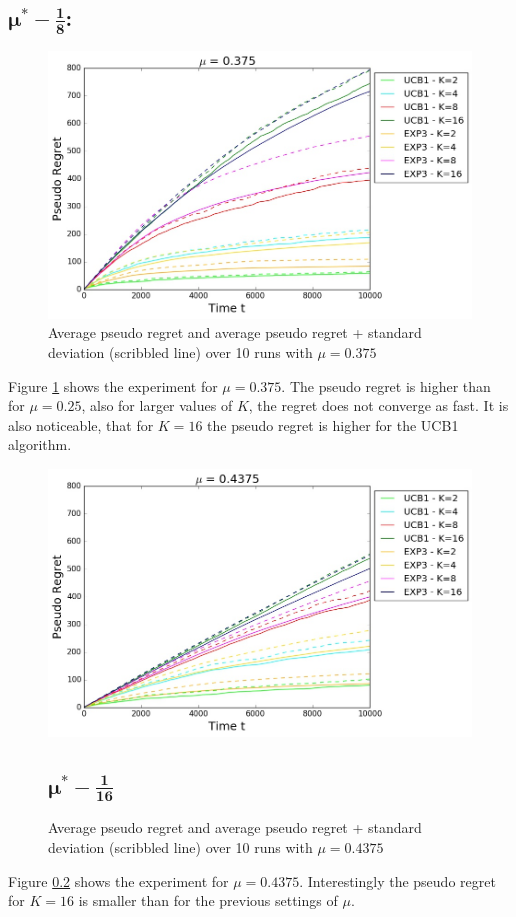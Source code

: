 \documentclass{article}
\begin{document}
\subsection{$\mathbf{\mu^* - \frac{1}{8}}$:}
\begin{figure}[H]
 \centering  \includegraphics[width=17cm]{fig/222.jpg}
  \caption{\footnotesize Average pseudo regret and average pseudo regret + standard deviation (scribbled line) over 10 runs with $\mu = 0.375$ }
\label{fig:2}
\end{figure}
Figure \ref{fig:2} shows the experiment for $\mu = 0.375$. The pseudo regret is higher than for $\mu = 0.25$, also for larger values of $K$, the regret does not converge as fast. It is also noticeable, that for $K=16$ the pseudo regret is higher for the UCB1 algorithm.
\begin{figure}[H]
 \centering  \includegraphics[width=17cm]{fig/333.jpg}
  \caption{\footnotesize Average pseudo regret and average pseudo regret + standard deviation (scribbled line) over 10 runs with $\mu = 0.4375$ }
\subsection{$\mathbf{\mu^* - \frac{1}{16}}$}
\label{fig:3}
\end{figure}
Figure \ref{fig:3} shows the experiment for $\mu = 0.4375$. Interestingly the pseudo regret for $K=16$ is smaller than for the previous settings of $\mu$.
\end{document}
